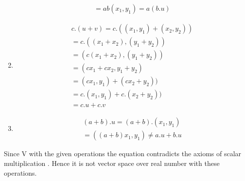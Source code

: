 \documentclass[journal,12pt,twocolumn]{IEEEtran}
\begin{document}
\begin{enumerate}
\begin{align}
  =ab(x_1,y_1)=a(b.u)
 \end{align}
 \item 
 \begin{align}
 c.(u+v)=c.((x_1,y_1)+(x_2,y_2))\\
 =c.((x_1+x_2),(y_1+y_2))\\
 =(c(x_1+x_2),(y_1+y_2))\\
 =(cx_1+cx_2,y_1+y_2)\\
 =(cx_1,y_1)+(cx_2+y_2))\\
 =c.(x_1,y_1)+c.(x_2+y_2))\\
 =c.u+c.v
 \end{align}
 \item
 \begin{align}
 (a+b).u=(a+b).(x_1,y_1)\\
 =((a+b)x_1,y_1)\neq a.u+b.u\label{contradict}
 \end{align}
\end{enumerate}
Since V with the given operations the equation   contradicts the axioms of scalar multiplication . Hence it is not vector space over real number with these operations.
\end{document}
